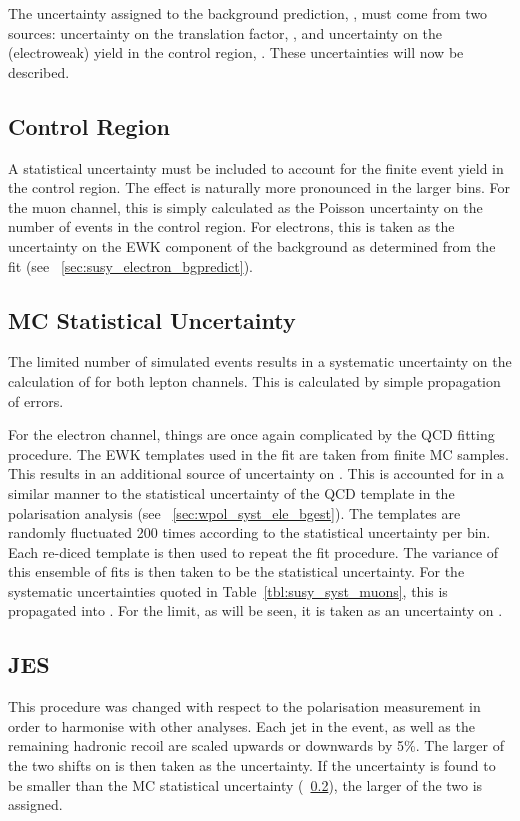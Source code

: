 The uncertainty assigned to the background prediction, \NBkg, must come from two
sources: uncertainty on the translation factor, \RCS, and uncertainty on the
(electroweak) yield in the control region, \NControl. These uncertainties will
now be described.

\subsection{Control Region \texorpdfstring{\LPcontrol}{\LPcontrolBM}}
A statistical uncertainty must be included to account for the finite event yield
in the control region. The effect is naturally more pronounced in the larger
\STlep bins. For the muon channel, this is simply calculated as the Poisson
uncertainty on the number of events in the control region. For electrons, this
is taken as the uncertainty on the \ac{EWK} component of the background as
determined from the fit (see \sec~\ref{sec:susy_electron_bgpredict}).

\subsection{\acl{MC} Statistical Uncertainty}
\label{sec:susy_syst_mcstats}
The limited number of simulated events results in a systematic uncertainty on
the calculation of \RCS for both lepton channels. This is calculated by simple
propagation of errors.

For the electron channel, things are once again complicated by the \ac{QCD}
fitting procedure. The \ac{EWK} templates used in the fit are taken from finite
\ac{MC} samples. This results in an additional source of uncertainty on
\NControl. This is accounted for in a similar manner to the statistical
uncertainty of the \ac{QCD} template in the \PW polarisation analysis (see
\sec~\ref{sec:wpol_syst_ele_bgest}). The templates are randomly fluctuated 200
times according to the statistical uncertainty per bin. Each re-diced template
is then used to repeat the fit procedure. The variance of this ensemble of fits
is then taken to be the statistical uncertainty. For the systematic
uncertainties quoted in Table~\ref{tbl:susy_syst_muons}, this is propagated into
\RCS. For the limit, as will be seen, it is taken as an uncertainty on
\NControl.

\subsection{\acl{JES}}
\label{sec:susy_jes_uncertainty}
This procedure was changed with respect to the \PW polarisation measurement in
order to harmonise with other analyses. Each jet in the event, as well as the
remaining hadronic recoil are scaled upwards or downwards by 5\%. The larger of
the two shifts on \RCS is then taken as the uncertainty. If the uncertainty is
found to be smaller than the \ac{MC} statistical uncertainty
(\sec~\ref{sec:susy_syst_mcstats}), the larger of the two is assigned.

